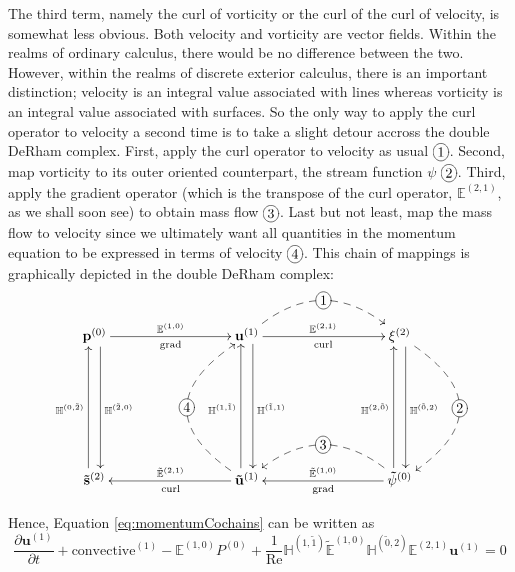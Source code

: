The third term, namely the curl of vorticity or the curl of the curl of velocity, is somewhat less obvious. Both velocity and vorticity are vector fields. Within the realms of ordinary calculus, there would be no difference between the two. However, within the realms of discrete exterior calculus, there is an important distinction; velocity is an integral value associated with lines whereas vorticity is an integral value associated with surfaces. So the only way to apply the curl operator to velocity a second time is to take a slight detour accross the double DeRham complex. First, apply the curl operator to velocity as usual $\xymatrix{*+[o][F-]{1}}$. Second, map vorticity to its outer oriented counterpart, the stream function $\psi$ $\xymatrix{*+[o][F-]{2}}$. Third, apply the gradient operator (which is the transpose of the curl operator, $\mathbb{E}^{(2,1)}$, as we shall soon see) to obtain mass flow $\xymatrix{*+[o][F-]{3}}$. Last but not least, map the mass flow to velocity since we ultimately want all quantities in the momentum equation to be expressed in terms of velocity $\xymatrix{*+[o][F-]{4}}$. This chain of mappings is graphically depicted in the double DeRham complex:
\begin{equation}
    \begin{gathered}
        \xymatrix@=20ex{
            \mathbf{p}^{(0)} \ar[r]^{\mathbb{E}^{(1,0)}}_{\text{grad}} \ar@<1ex>[d]^{\mathbb{H}^{(\tilde{2},0)}} & \mathbf{u}^{(1)} \ar[r]^{\mathbb{E}^{(2,1)}}_{\text{curl}} \ar @/^6ex/ @{-->} [r]|-*+[o][F-]{1} \ar@<1ex>[d]^{\mathbb{H}^{(\tilde{1},1)}} & \mathbf{\xi}^{(2)} \ar@<1ex>[d]^{\mathbb{H}^{(\tilde{0},2)}} \ar @/^10ex/ @{-->} [d]|-*+[o][F-]{2} \\
            \mathbf{\tilde{s}}^{(2)} \ar@<1ex>[u]^{\mathbb{H}^{(0,\tilde{2})}} & \mathbf{\tilde{u}}^{(1)} \ar[l]_{\tilde{\mathbb{E}}^{(2, 1)}}^{\text{curl}} \ar@<1ex>[u]^{\mathbb{H}^{(1,\tilde{1})}} \ar @/^10ex/ @{-->} [u]|-*+[o][F-]{4} & \mathbf{\tilde{\psi}}^{(0)} \ar[l]_{\tilde{\mathbb{E}}^{(1,0)}}^{\text{grad}} \ar @/_6ex/ @{-->} [l]|-*+[o][F-]{3} \ar@<1ex>[u]^{\mathbb{H}^{(2,\tilde{0})}}
        }
    \end{gathered}
\end{equation}

Hence, Equation \ref{eq:momentumCochains} can be written as
\begin{equation}
    \frac{\partial \mathbf{u}^{(1)}}{\partial t} + \text{convective}^{(1)} - \mathbb{E}^{(1,0)} P^{(0)} + \frac{1}{\text{Re}} \mathbb{H}^{(1,\tilde{1})} \tilde{\mathbb{E}}^{(1,0)} \mathbb{H}^{(\tilde{0},2)} \mathbb{E}^{(2,1)} \mathbf{u}^{(1)} = 0
\end{equation}

